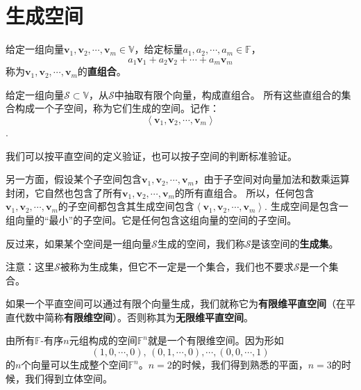 \documentclass[12pt,UTF8,fontset=none]{ctexbook}
\begin{document}
\begin{center}
\end{center}

\section{生成空间}
\begin{df}\label{df2_1}
    给定一组向量$\mathbf{v}_1, \mathbf{v}_2 , \cdots , \mathbf{v}_m \in \mathbb{V}$，给定标量$a_1, a_2, \cdots, a_m\in \mathbb{F}$，
    $$a_1\mathbf{v}_1+a_2\mathbf{v}_2 + \cdots + a_m\mathbf{v}_m$$
    称为$\mathbf{v}_1, \mathbf{v}_2 , \cdots , \mathbf{v}_m$的\textbf{直组合}。
\end{df}

\begin{pp}\label{pp:2_1}
    给定一组向量$\mathcal{S} \subset \mathbb{V}$，从$\mathcal{S}$中抽取有限个向量，构成直组合。
    所有这些直组合的集合构成一个子空间，称为它们生成的空间。记作：
    $$ \left \langle \mathbf{v}_1, \mathbf{v}_2 , \cdots , \mathbf{v}_m \right \rangle$$.
\end{pp}
我们可以按平直空间的定义验证，也可以按子空间的判断标准验证。

另一方面，假设某个子空间包含$\mathbf{v}_1, \mathbf{v}_2 , \cdots , \mathbf{v}_m$，由于子空间对向量加法和数乘运算封闭，它自然也包含了所有$\mathbf{v}_1, \mathbf{v}_2 , \cdots , \mathbf{v}_m$的所有直组合。
所以，任何包含$\mathbf{v}_1, \mathbf{v}_2 , \cdots , \mathbf{v}_m$的子空间都包含其生成空间包含$\left\langle\mathbf{v}_1, \mathbf{v}_2 , \cdots , \mathbf{v}_m\right\rangle$. 
生成空间是包含一组向量的“最小”的子空间。它是任何包含这组向量的空间的子空间。

反过来，如果某个空间是一组向量$\mathcal{S}$生成的空间，我们称$\mathcal{S}$是该空间的\textbf{生成集}。

注意：这里$\mathcal{S}$被称为生成集，但它不一定是一个集合，我们也不要求$\mathcal{S}$是一个集合。

如果一个平直空间可以通过有限个向量生成，我们就称它为{\bfseries 有限维平直空间}（在平直代数中简称{\bfseries 有限维空间}）。否则称其为{\bfseries 无限维平直空间}。

由所有$\mathbb{F}$-有序$n$元组构成的空间$\mathbb{F}^n$就是一个有限维空间。因为形如
$$ (1,0,\cdots, 0), \, (0,1,\cdots,0),\cdots ,(0,0,\cdots,1)$$
的$n$个向量可以生成整个空间$\mathbb{F}^n$。$n=2$的时候，我们得到熟悉的平面，$n=3$的时候，我们得到立体空间。
\end{document}
